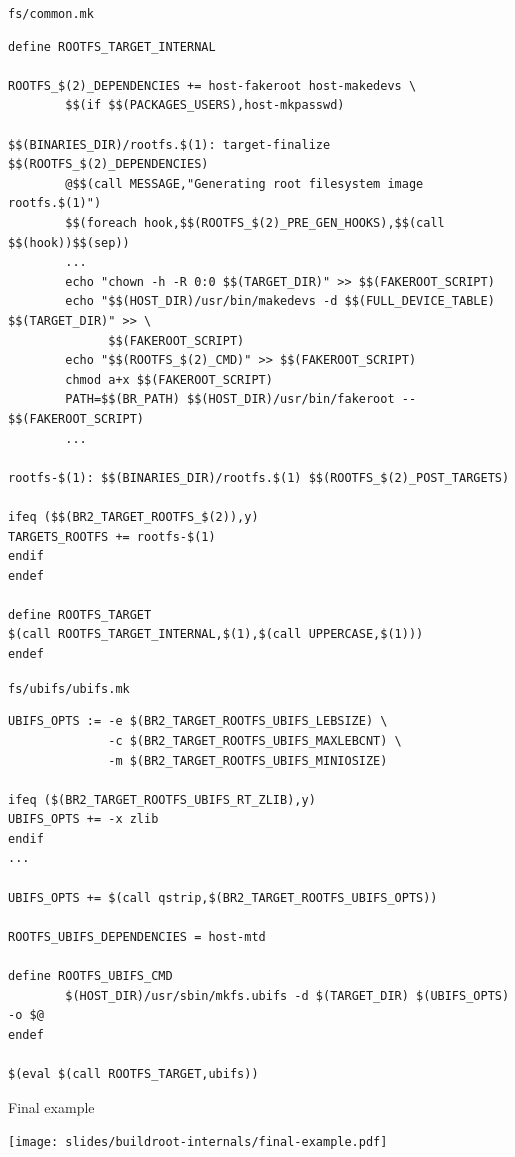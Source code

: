 \begin{frame}[fragile]{{\tt fs/common.mk}}
  \begin{block}{}
    \begin{verbatim}
define ROOTFS_TARGET_INTERNAL

ROOTFS_$(2)_DEPENDENCIES += host-fakeroot host-makedevs \
        $$(if $$(PACKAGES_USERS),host-mkpasswd)

$$(BINARIES_DIR)/rootfs.$(1): target-finalize $$(ROOTFS_$(2)_DEPENDENCIES)
        @$$(call MESSAGE,"Generating root filesystem image rootfs.$(1)")
        $$(foreach hook,$$(ROOTFS_$(2)_PRE_GEN_HOOKS),$$(call $$(hook))$$(sep))
        ...
        echo "chown -h -R 0:0 $$(TARGET_DIR)" >> $$(FAKEROOT_SCRIPT)
        echo "$$(HOST_DIR)/usr/bin/makedevs -d $$(FULL_DEVICE_TABLE) $$(TARGET_DIR)" >> \
              $$(FAKEROOT_SCRIPT)
        echo "$$(ROOTFS_$(2)_CMD)" >> $$(FAKEROOT_SCRIPT)
        chmod a+x $$(FAKEROOT_SCRIPT)
        PATH=$$(BR_PATH) $$(HOST_DIR)/usr/bin/fakeroot -- $$(FAKEROOT_SCRIPT)
        ...

rootfs-$(1): $$(BINARIES_DIR)/rootfs.$(1) $$(ROOTFS_$(2)_POST_TARGETS)

ifeq ($$(BR2_TARGET_ROOTFS_$(2)),y)
TARGETS_ROOTFS += rootfs-$(1)
endif
endef

define ROOTFS_TARGET
$(call ROOTFS_TARGET_INTERNAL,$(1),$(call UPPERCASE,$(1)))
endef
    \end{verbatim}
  \end{block}
\end{frame}

\begin{frame}[fragile]{{\tt fs/ubifs/ubifs.mk}}
  \begin{block}{}
    \begin{verbatim}
UBIFS_OPTS := -e $(BR2_TARGET_ROOTFS_UBIFS_LEBSIZE) \
              -c $(BR2_TARGET_ROOTFS_UBIFS_MAXLEBCNT) \
              -m $(BR2_TARGET_ROOTFS_UBIFS_MINIOSIZE)

ifeq ($(BR2_TARGET_ROOTFS_UBIFS_RT_ZLIB),y)
UBIFS_OPTS += -x zlib
endif
...

UBIFS_OPTS += $(call qstrip,$(BR2_TARGET_ROOTFS_UBIFS_OPTS))

ROOTFS_UBIFS_DEPENDENCIES = host-mtd

define ROOTFS_UBIFS_CMD
        $(HOST_DIR)/usr/sbin/mkfs.ubifs -d $(TARGET_DIR) $(UBIFS_OPTS) -o $@
endef

$(eval $(call ROOTFS_TARGET,ubifs))
    \end{verbatim}
  \end{block}
\end{frame}

\begin{frame}{Final example}
  \begin{center}
    \texttt{[image: slides/buildroot-internals/final-example.pdf]}
  \end{center}
\end{frame}
